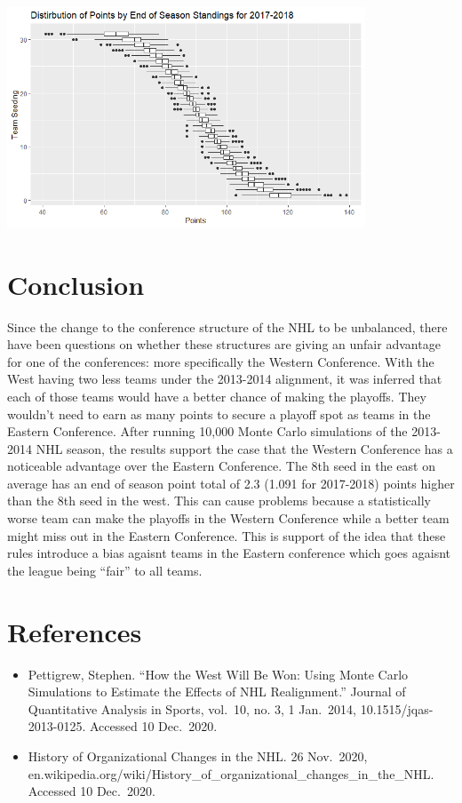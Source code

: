 \documentclass[
]{article}
\begin{document}
\includegraphics[width=0.8\textwidth,height=\textheight]{Images/seedplace20172018.png}

\hypertarget{conclusion}{%
\section{Conclusion}\label{conclusion}}

Since the change to the conference structure of the NHL to be
unbalanced, there have been questions on whether these structures are
giving an unfair advantage for one of the conferences: more specifically
the Western Conference. With the West having two less teams under the
2013-2014 alignment, it was inferred that each of those teams would have
a better chance of making the playoffs. They wouldn't need to earn as
many points to secure a playoff spot as teams in the Eastern Conference.
After running 10,000 Monte Carlo simulations of the 2013-2014 NHL
season, the results support the case that the Western Conference has a
noticeable advantage over the Eastern Conference. The 8th seed in the
east on average has an end of season point total of 2.3 (1.091 for
2017-2018) points higher than the 8th seed in the west. This can cause
problems because a statistically worse team can make the playoffs in the
Western Conference while a better team might miss out in the Eastern
Conference. This is support of the idea that these rules introduce a
bias agaisnt teams in the Eastern conference which goes agaisnt the
league being ``fair'' to all teams.

\hypertarget{references}{%
\section{References}\label{references}}

\begin{itemize}
\item
  Pettigrew, Stephen. ``How the West Will Be Won: Using Monte Carlo
  Simulations to Estimate the Effects of NHL Realignment.'' Journal of
  Quantitative Analysis in Sports, vol.~10, no. 3, 1 Jan.~2014,
  10.1515/jqas-2013-0125. Accessed 10 Dec.~2020.
\item
  History of Organizational Changes in the NHL. 26 Nov.~2020,
  en.wikipedia.org/wiki/History\_of\_organizational\_changes\_in\_the\_NHL.
  Accessed 10 Dec.~2020.
\end{itemize}
\end{document}
